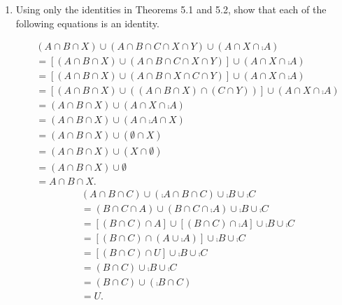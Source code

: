 \documentclass[12pt]{book}
\begin{document}
\begin{enumerate}
\renewcommand{\labelenumii}{(\alph{enumii})}
\item Using only the identities in Theorems 5.1 and 5.2, show that each of the following equations is an identity.
\begin{enumerate}
	{\begin{align*}&(A \cap B \cap X) \cup (A \cap B \cap C \cap X \cap Y) \cup (A \cap X \cap \comp{A})\\&= [(A \cap B \cap X) \cup (A \cap B \cap C \cap X \cap Y)] \cup (A \cap X \cap \comp{A})\\&= [(A \cap B \cap X) \cup (A \cap B \cap X \cap C \cap Y)] \cup (A \cap X \cap \comp{A})\\&= [(A \cap B \cap X) \cup ((A \cap B \cap X) \cap (C \cap Y))] \cup (A \cap X \cap \comp{A})\\&= (A \cap B \cap X) \cup (A \cap X \cap \comp{A})\\&= (A \cap B \cap X) \cup (A \cap \comp{A} \cap X)\\&= (A \cap B \cap X) \cup (\emptyset \cap X)\\&= (A \cap B \cap X) \cup (X \cap \emptyset)\\&= (A \cap B \cap X) \cup \emptyset\\&= A \cap B \cap X.\end{align*}}
	{\begin{align*}&(A \cap B \cap C) \cup (\comp{A} \cap B \cap C) \cup \comp{B} \cup \comp{C}\\&= (B \cap C \cap A) \cup (B \cap C \cap \comp{A}) \cup \comp{B} \cup \comp{C}\\&= [(B \cap C) \cap A] \cup [(B \cap C) \cap \comp{A}] \cup \comp{B} \cup \comp{C}\\&= [(B \cap C) \cap (A \cup \comp{A})] \cup \comp{B} \cup \comp{C}\\&= [(B \cap C) \cap U] \cup \comp{B} \cup \comp{C}\\&= (B \cap C) \cup \comp{B} \cup \comp{C}\\&= (B \cap C) \cup (\comp{B \cap C})\\&= U.\end{align*}}

\end{enumerate}
\end{enumerate}
\end{document}

